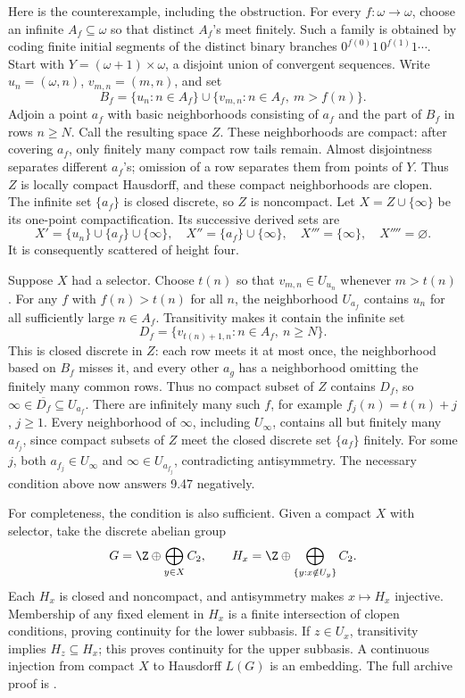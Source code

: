 Here is the counterexample, including the obstruction.
For every \(f:\omega\to\omega\), choose an infinite \(A_f\subseteq\omega\)
so that distinct \(A_f\)'s meet finitely. Such a family is obtained by
coding finite initial segments of the distinct binary branches
\(0^{f(0)}1\,0^{f(1)}1\cdots\).
Start with \(Y=(\omega+1)\times\omega\), a disjoint union of convergent
sequences. Write \(u_n=(\omega,n)\), \(v_{m,n}=(m,n)\), and set
\[
 B_f=\{u_n:n\in A_f\}\cup
       \{v_{m,n}:n\in A_f,\ m>f(n)\}.
\]
Adjoin a point \(a_f\) with basic neighborhoods consisting of \(a_f\)
and the part of \(B_f\) in rows \(n\ge N\).
Call the resulting space \(Z\). These neighborhoods are compact:
after covering \(a_f\), only finitely many compact row tails remain.
Almost disjointness separates different \(a_f\)'s; omission of a row
separates them from points of \(Y\). Thus \(Z\) is locally compact
Hausdorff, and these compact neighborhoods are clopen.
The infinite set \(\{a_f\}\) is closed discrete, so \(Z\) is noncompact.
Let \(X=Z\cup\{\infty\}\) be its one-point compactification.
Its successive derived sets are
\[
 X'=\{u_n\}\cup\{a_f\}\cup\{\infty\},\quad
 X''=\{a_f\}\cup\{\infty\},\quad
 X'''=\{\infty\},\quad X''''=\varnothing.
\]
It is consequently scattered of height four.

Suppose \(X\) had a selector. Choose \(t(n)\) so that
\(v_{m,n}\in U_{u_n}\) whenever \(m>t(n)\).
For any \(f\) with \(f(n)>t(n)\) for all \(n\), the neighborhood
\(U_{a_f}\) contains \(u_n\) for all sufficiently large \(n\in A_f\).
Transitivity makes it contain the infinite set
\[
 D_f=\{v_{t(n)+1,n}:n\in A_f,\ n\ge N\}.
\]
This is closed discrete in \(Z\): each row meets it at most once,
the neighborhood based on \(B_f\) misses it, and every other \(a_g\)
has a neighborhood omitting the finitely many common rows.
Thus no compact subset of \(Z\) contains \(D_f\), so
\(\infty\in\overline{D_f}\subseteq U_{a_f}\).
There are infinitely many such \(f\), for example \(f_j(n)=t(n)+j\),
\(j\ge1\). Every neighborhood of \(\infty\), including \(U_\infty\),
contains all but finitely many \(a_{f_j}\), since compact subsets of
\(Z\) meet the closed discrete set \(\{a_f\}\) finitely.
For some \(j\), both \(a_{f_j}\in U_\infty\) and
\(\infty\in U_{a_{f_j}}\), contradicting antisymmetry.
The necessary condition above now answers 9.47 negatively.

For completeness, the condition is also sufficient.
Given a compact \(X\) with selector, take the discrete abelian group
\[
 G=\Z\oplus\bigoplus_{y\in X}C_2,\qquad
 H_x=\Z\oplus\bigoplus_{\{y:x\notin U_y\}}C_2.
\]
Each \(H_x\) is closed and noncompact, and antisymmetry makes
\(x\mapsto H_x\) injective.
Membership of any fixed element in \(H_x\) is a finite intersection
of clopen conditions, proving continuity for the lower subbasis.
If \(z\in U_x\), transitivity implies \(H_z\subseteq H_x\);
this proves continuity for the upper subbasis.
A continuous injection from compact \(X\) to Hausdorff \(L(G)\)
is an embedding. The full archive proof is
.
